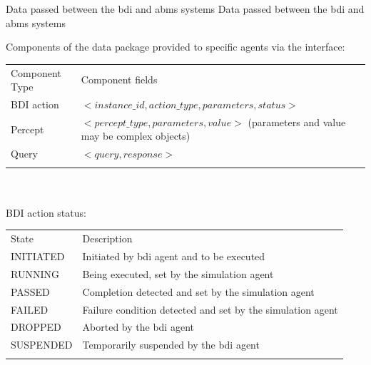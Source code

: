 \createtable%
{Data passed between the \gls{bdi} and \gls{abms} systems}%
{Data passed between the \gls{bdi} and \gls{abms} systems}%
{\label{interfacedata}}%
{%
Components of the data package provided to specific agents via the interface:\\ 
  \begin{tabular}{ @{}p{} | p{}@{}}
\hline\noalign{\smallskip}
{Component Type} & {Component fields}\\
\noalign{\smallskip}\hline\noalign{\smallskip}
{BDI action} & $<instance\_id, action\_type, parameters, status>$  \\
{Percept} & $<percept\_type, parameters, value>$
(parameters and value may be complex objects) \\
{Query} & $<query, response>$ \\
\noalign{\smallskip}\hline
\end{tabular}

~\\~\\BDI action status:\\
\begin{tabular}{ @{}p{} | p{}@{}}
\hline\noalign{\smallskip}
{State} & {Description}\\
\noalign{\smallskip}\hline\noalign{\smallskip}
INITIATED & Initiated by \gls{bdi} agent and to be executed\\
RUNNING & Being executed, set by the simulation agent\\
PASSED & Completion detected and set by the simulation agent \\
FAILED & Failure condition detected and set by the simulation agent \\
DROPPED & Aborted by the \gls{bdi} agent \\
SUSPENDED & Temporarily suspended by the \gls{bdi} agent  \\
\noalign{\smallskip}\hline
\end{tabular}
}%
{}

